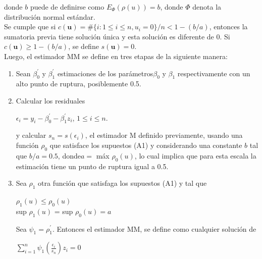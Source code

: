 donde $b$ puede de definirse como $E_{\Phi}(\rho(u)) = b$, donde $\Phi$ denota la distribución normal estándar.\\

Se cumple que si $c(\mathbf{u}) = \#\{i : 1 \leq i \leq n, u_{i}=0\} / n < 1- (b/a) $, entonces la sumatoria previa tiene solución única y esta solución es diferente de 0. Si $c(\mathbf{u}) \geq 1 -  (b/a)$, se define $s(\mathbf{u}) = 0$. \\

Luego, el estimador MM se define en tres etapas de la siguiente manera:\\

\begin{enumerate}
	\item Sean $ \beta_{0}^{'}$ y $ \beta_{1}^{'}$ estimaciones de los parámetros$ \beta_{0}$ y $ \beta_{1}$ respectivamente con un alto punto de ruptura, posiblemente 0.5.
	\item  Calcular los residuales\\
	\begin{center}
		 $ \epsilon_{i} = y_{i} -\beta_{0}^{'} -\beta_{1}^{'} z_{i}  $, $1 \leq i \leq n $.\\
	\end{center}
	
	y calcular $s_{n} = s(\epsilon_{i})$, el estimador M definido previamente, usando una función $\rho_{0}$ que satisface los supuestos (A1) y considerando una constante $b$ tal que $b/a = 0.5$, donde$ a = $ máx $ \rho_{0}(u)$, lo cual implica que para esta escala la estimación tiene un
	punto de ruptura igual a 0.5.
	
	\item  Sea $\rho_{1}$ otra función que satisfaga los supuestos (A1) y tal que\\
	\begin{center}
		$\rho_{1}(u) \leq \rho_{0}(u)$\\
		sup $\rho_{1}(u)$  = sup $ \rho_{0}(u) = a$\\
	\end{center}

	
	Sea $\psi_{1} = \rho_{1}^{'}$. Entonces el estimador MM, se define como cualquier solución de\\
	\begin{center}
		$\sum_{i=1}^{n} \psi_{1} (\frac{\epsilon_{i}}{s_{n}}) z_{i} = 0$\\
	\end{center}

\end{enumerate}


